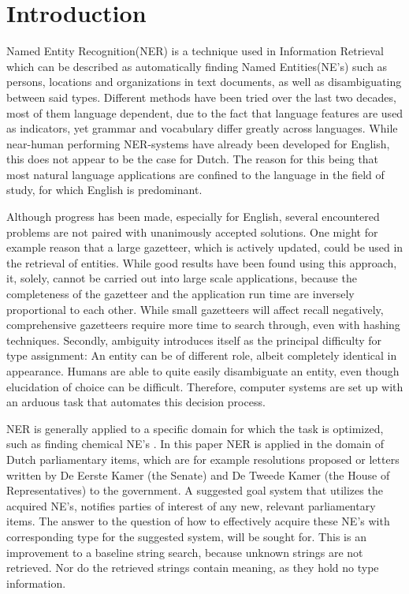 \section{Introduction} \label{sec:introduction}
Named Entity Recognition(NER) is a technique used in Information Retrieval which can be described as automatically finding Named Entities(NE's) such as persons, locations and organizations in text documents, as well as disambiguating between said types. Different methods have been tried over the last two decades, most of them language dependent, due to the fact that language features are used as indicators, yet grammar and vocabulary differ greatly across languages. While near-human performing NER-systems have already been developed for English, this does not appear to be the case for Dutch. The reason for this being that most natural language applications are confined to the language in the field of study, for which English is predominant.  

Although progress has been made, especially for English, several encountered problems are not paired with unanimously accepted solutions. 
One might for example reason that a large gazetteer, which is actively updated, could be used in the retrieval of entities. While good results have been found using this approach, it, solely, cannot be carried out into large scale applications, because the completeness of the gazetteer and the application run time are inversely proportional to each other. While small gazetteers will affect recall negatively, comprehensive gazetteers require more time to search through, even with hashing techniques. 
Secondly, ambiguity introduces itself as the principal difficulty for type assignment: An entity can be of different role, albeit completely identical in appearance. Humans are able to quite easily disambiguate an entity, even though elucidation of choice can be difficult. Therefore, computer systems are set up with an arduous task that automates this decision process.

NER is generally applied to a specific domain for which the task is optimized, such as finding chemical NE's \cite{rocktaschel2012chemspot}. 
In this paper NER is applied in the domain of Dutch parliamentary items, which are for example resolutions proposed or letters written by De Eerste Kamer (the Senate) and De Tweede Kamer (the House of Representatives) to the government. A suggested goal system that utilizes the acquired NE's, notifies parties of interest of any new, relevant parliamentary items.
The answer to the question of how to effectively acquire these NE's with corresponding type for the suggested system, will be sought for.
This is an improvement to a baseline string search, because unknown strings are not retrieved. Nor do the retrieved strings contain meaning, as they hold no type information.

